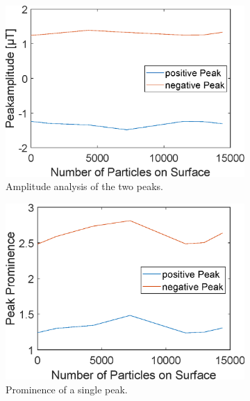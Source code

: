 \begin{figure}[htb!]
	\begin{subfigure}[l]{0.49\linewidth} 
		\centering
		\includegraphics[clip,trim={0mm 0mm 0mm 0mm}, width=\linewidth]{Ressourcen/Results/Singularity/ampl}
		\caption{Amplitude analysis of the two peaks.}
		\label{fig:sim:singularity:ampl}
	\end{subfigure}
	\hfil
	\begin{subfigure}[r]{0.49\linewidth} 
		\centering
		\includegraphics[clip,trim={0mm 0mm 0mm 0mm}, width=\linewidth]{Ressourcen/Results/Singularity/prom}
		\caption{Prominence of a single peak.}
		\label{fig:sim:singularity:prom}
	\end{subfigure}
	\vfil
	\begin{subfigure}[r]{0.49\linewidth} 

\end{subfigure}
\end{figure}
